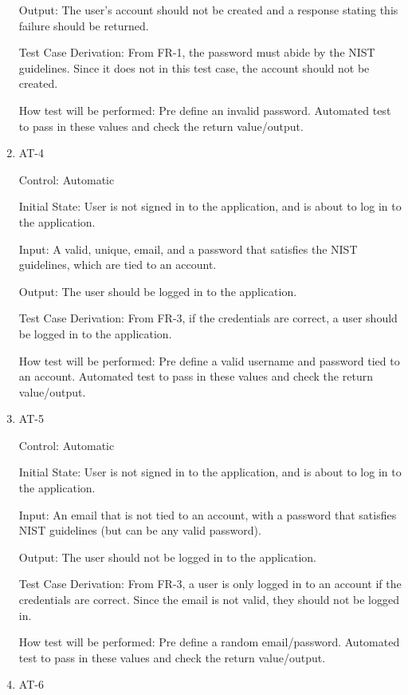 \documentclass[12pt, titlepage]{article}
\begin{document}
\begin{enumerate}
Output: The user's account should not be created and a response stating this failure should be returned.

Test Case Derivation: From FR-1, the password must abide by the NIST guidelines. Since it does not in this test case, the account should not 
be created.

How test will be performed: Pre define an invalid password. Automated test to pass in these values and check the return value/output.


\item{AT-4\\}

Control: Automatic
					
Initial State: User is not signed in to the application, and is about to log in to the application.
					
Input: A valid, unique, email, and a password that satisfies the NIST guidelines, which are tied to an account.
					
Output: The user should be logged in to the application.

Test Case Derivation: From FR-3, if the credentials are correct, a user should be logged in to the application.

How test will be performed: Pre define a valid username and password tied to an account. Automated test to pass in these values and check the return value/output.


\item{AT-5\\}

Control: Automatic
					
Initial State: User is not signed in to the application, and is about to log in to the application.
					
Input: An email that is not tied to an account, with a password that satisfies NIST guidelines (but can be any valid password).
					
Output: The user should not be logged in to the application.

Test Case Derivation: From FR-3, a user is only logged in to an account if the credentials are correct. Since the email is not valid,
they should not be logged in.

How test will be performed: Pre define a random email/password. Automated test to pass in these values and check the return value/output.

\item{AT-6\\}


\end{enumerate}
\end{document}
